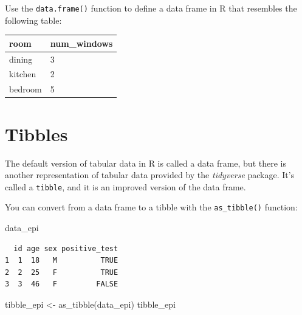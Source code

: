 \documentclass[
  letterpaper,
  DIV=11,
  numbers=noendperiod]{scrreprt}
\newenvironment{Shaded}{\begin{snugshade}}{\end{snugshade}}
\newcommand{\FunctionTok}[1]{\textcolor[rgb]{0.28,0.35,0.67}{#1}}
\newcommand{\NormalTok}[1]{\textcolor[rgb]{0.00,0.23,0.31}{#1}}
\newcommand{\OtherTok}[1]{\textcolor[rgb]{0.00,0.23,0.31}{#1}}
\begin{document}
\begin{tcolorbox}[enhanced jigsaw, colframe=quarto-callout-tip-color-frame, rightrule=.15mm, opacityback=0, breakable, coltitle=black, colbacktitle=quarto-callout-tip-color!10!white, bottomrule=.15mm, leftrule=.75mm, toprule=.15mm, arc=.35mm, bottomtitle=1mm, colback=white, left=2mm, opacitybacktitle=0.6, titlerule=0mm, title=\textcolor{quarto-callout-tip-color}{\faLightbulb}\hspace{0.5em}{Practice}, toptitle=1mm]

Use the \texttt{data.frame()} function to define a data frame in R that
resembles the following table:

\begin{longtable}[]{@{}ll@{}}
\toprule\noalign{}
room & num\_windows \\
\midrule\noalign{}
\endhead
\bottomrule\noalign{}
\endlastfoot
dining & 3 \\
kitchen & 2 \\
bedroom & 5 \\
\end{longtable}

\end{tcolorbox}

\hypertarget{tibbles}{%
\section{Tibbles}\label{tibbles}}

The default version of tabular data in R is called a data frame, but
there is another representation of tabular data provided by the
\emph{tidyverse} package. It's called a \texttt{tibble}, and it is an
improved version of the data frame.

You can convert from a data frame to a tibble with the
\texttt{as\_tibble()} function:

\begin{Shaded}
\begin{Highlighting}[]
\NormalTok{data\_epi}
\end{Highlighting}
\end{Shaded}

\begin{verbatim}
  id age sex positive_test
1  1  18   M          TRUE
2  2  25   F          TRUE
3  3  46   F         FALSE
\end{verbatim}

\begin{Shaded}
\begin{Highlighting}[]
\NormalTok{tibble\_epi }\OtherTok{\textless{}{-}} \FunctionTok{as\_tibble}\NormalTok{(data\_epi)}
\NormalTok{tibble\_epi}
\end{Highlighting}
\end{Shaded}
\end{document}

